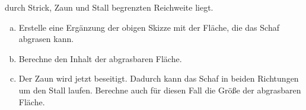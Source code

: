 \begin{exercise}
    durch Strick, Zaun und Stall begrenzten
    Reichweite liegt.
    \begin{enumerate}[a)]
      \item Erstelle eine Ergänzung der obigen Skizze
            mit der Fläche, die das Schaf abgrasen
            kann.
      \item Berechne den Inhalt der abgrasbaren
            Fläche.
      \item Der Zaun wird jetzt beseitigt. Dadurch
            kann das Schaf in beiden Richtungen um
            den Stall laufen. Berechne auch für
            diesen Fall die Größe der abgrasbaren
            Fläche.
    \end{enumerate}
  \fi
\end{exercise}

